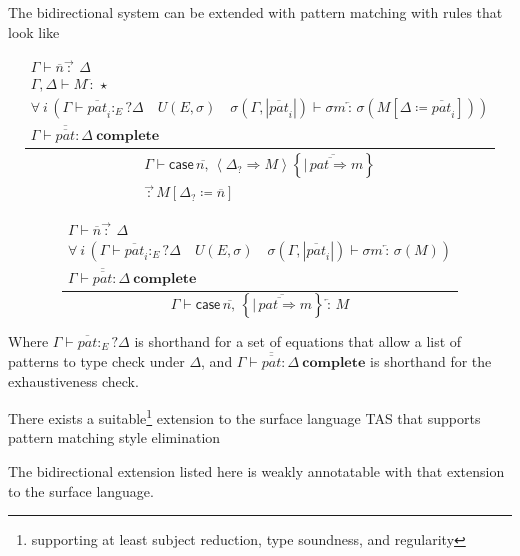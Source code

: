 The bidirectional system can be extended with pattern matching with rules that look like 

\[
\frac{\begin{array}{c}
\Gamma\vdash\overline{n}\overrightarrow{\,:\,}\ \Delta\\
\Gamma,\Delta\vdash M\overleftarrow{\,:\,}\star\\
\forall\:i\,\left(\Gamma\vdash\overline{pat}_{i}:_{E}?\Delta\quad U\left(E,\sigma\right)\quad\sigma\left(\Gamma,|\overline{pat}_{i}|\right)\vdash\sigma m\overleftarrow{\,:\,}\sigma\left(M\left[\Delta\coloneqq\overline{pat}_{i}\right]\right)\right)\\
\Gamma\vdash\overline{\overline{pat}}:\Delta\ \mathbf{complete}
\end{array}}{\begin{array}{c}
\Gamma\vdash\mathsf{case}\,\overline{n,}\,\left\langle \Delta_{?}\Rightarrow M\right\rangle \left\{ \overline{|\,\overline{pat\Rightarrow}m}\right\} \\
\overrightarrow{\,:\,}M\left[\Delta_{?}\coloneqq\overline{n}\right]
\end{array}}
\]


\[
\frac{\begin{array}{c}
\Gamma\vdash\overline{n}\overrightarrow{\,:\,}\ \Delta\\
\forall\:i\,\left(\Gamma\vdash\overline{pat}_{i}:_{E}?\Delta\quad U\left(E,\sigma\right)\quad\sigma\left(\Gamma,|\overline{pat}_{i}|\right)\vdash\sigma m\overleftarrow{\,:\,}\sigma\left(M\right)\right)\\
\Gamma\vdash\overline{\overline{pat}}:\Delta\ \mathbf{complete}
\end{array}}{\Gamma\vdash\mathsf{case}\,\overline{n,}\,\left\{ \overline{|\,\overline{pat\Rightarrow}m}\right\} \overleftarrow{\,:\,}M}
\]

Where $\Gamma\vdash\overline{pat}:_{E}?\Delta$ is shorthand for a set of equations that allow a list of patterns to type check under $\Delta$, 
  and $\Gamma\vdash\overline{\overline{pat}}:\Delta\ \mathbf{complete}$ is shorthand for the exhaustiveness check. 
\begin{conjecture}
There exists a suitable\footnote{supporting at least subject reduction, type soundness, and regularity} extension to the surface language \ac{TAS} that supports pattern matching style elimination
\end{conjecture}
\begin{conjecture}
The bidirectional extension listed here is weakly annotatable with that extension to the surface language.
\end{conjecture}
 
